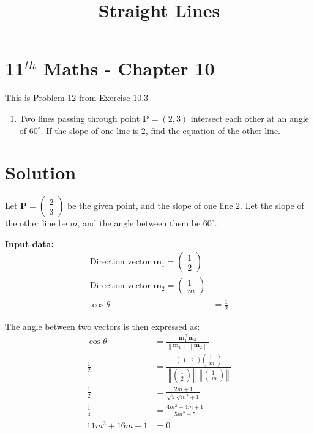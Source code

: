 \documentclass[10pt]{article}
\newcommand{\myvec}[1]{\ensuremath{\begin{pmatrix}#1\end{pmatrix}}}
\let\vec\mathbf
\providecommand{\norm}[1]{\left\lVert#1\right\rVert}
\let\vec\mathbf
\renewcommand{\vec}[1]{\textbf{#1}}
\begin{document}
\title{\textbf{Straight Lines}}
\date{\vspace{-5ex}}
\maketitle

\section*{11$^{th}$ Maths - Chapter 10}
This is Problem-12 from Exercise 10.3

\begin{enumerate}
\item Two lines passing through point $\vec{P} = (2,3)$ intersect each other at an angle of $60^\circ$. If the slope of one line is $2$, find the equation of the other line.
\end{enumerate}

\section{Solution}

Let $\vec{P} = \myvec{ 2 \\ 3 }$ be the given point, and the slope of one line $2$. Let the slope of the other line be $m$, and the angle between them be $60^\circ$.

\textbf{Input data:}
\begin{align}
\text{Direction vector } \vec{m}_1 =  \myvec{1 \\ 2}  \\
\text{Direction vector } \vec{m}_2 =  \myvec{1 \\ m}  \\
\cos \theta &= \frac{1}{2}
\end{align}

The angle between two vectors is then expressed as:
\begin{align}
\cos \theta &= \frac{\vec{m}_1^\top \vec{m}_2}{\norm{\vec{m}_1}\norm{\vec{m}_2}} \\
\frac{1}{2} &= \frac{\myvec{ 1 & 2} \myvec{ 1 \\ m} }{\norm{\myvec{ 1 \\ 2 }}\norm{\myvec{1 \\ m } }}\\
\frac{1}{2} &= \frac{2m + 1}{\sqrt{5} \sqrt{m^2 + 1}} \\
\frac{1}{4} &= \frac{4m^2 + 4m + 1}{5m^2 + 5} \\
11m^2 + 16m - 1 &= 0
\end{align}
\end{document}
